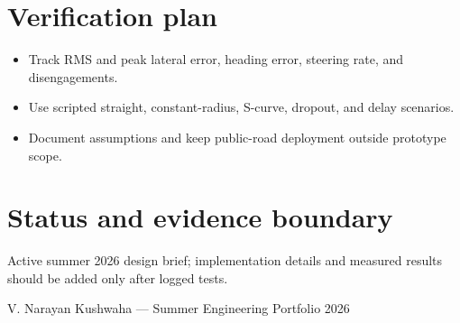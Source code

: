 \documentclass[10pt]{article}
\begin{document}
\section*{Verification plan}
\begin{itemize}
\item Track RMS and peak lateral error, heading error, steering rate, and disengagements.
\item Use scripted straight, constant-radius, S-curve, dropout, and delay scenarios.
\item Document assumptions and keep public-road deployment outside prototype scope.
\end{itemize}

\section*{Status and evidence boundary}
Active summer 2026 design brief; implementation details and measured results should be added only after logged tests.

\vfill
\small\color{muted} V. Narayan Kushwaha --- Summer Engineering Portfolio 2026
\end{document}
